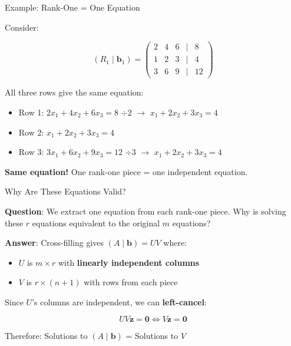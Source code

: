 \documentclass[10pt]{beamer}
\theoremstyle{definition}
\newcommand{\x}[1]{\alert{\textbf{#1}}}
\begin{document}
\begin{frame}{Example: Rank-One = One Equation}

Consider:

$$(R_1 \mid \mathbf{b}_1) = \begin{pmatrix}
2 & 4 & 6 & | & 8 \\
1 & 2 & 3 & | & 4 \\
3 & 6 & 9 & | & 12
\end{pmatrix}$$

\vspace{0.5em}

All three rows give the same equation:
\begin{itemize}
\item Row 1: $2x_1 + 4x_2 + 6x_3 = 8$ $\div 2$ $\to$ $x_1 + 2x_2 + 3x_3 = 4$
\item Row 2: $x_1 + 2x_2 + 3x_3 = 4$
\item Row 3: $3x_1 + 6x_2 + 9x_3 = 12$ $\div 3$ $\to$ $x_1 + 2x_2 + 3x_3 = 4$
\end{itemize}

\x{Same equation!} One rank-one piece = one independent equation.

\end{frame}

\begin{frame}{Why Are These Equations Valid?}

\x{Question}: We extract one equation from each rank-one piece. Why is solving these $r$ equations equivalent to the original $m$ equations?

\vspace{1em}

\x{Answer}: Cross-filling gives $(A \mid \mathbf{b}) = UV$ where:
\begin{itemize}
\item $U$ is $m \times r$ with \textbf{linearly independent columns}
\item $V$ is $r \times (n+1)$ with rows from each piece
\end{itemize}

Since $U$'s columns are independent, we can \x{left-cancel}:

$$UV\mathbf{z} = \mathbf{0} \iff V\mathbf{z} = \mathbf{0}$$

Therefore: Solutions to $(A \mid \mathbf{b})$ = Solutions to $V$

\end{frame}
\end{document}
